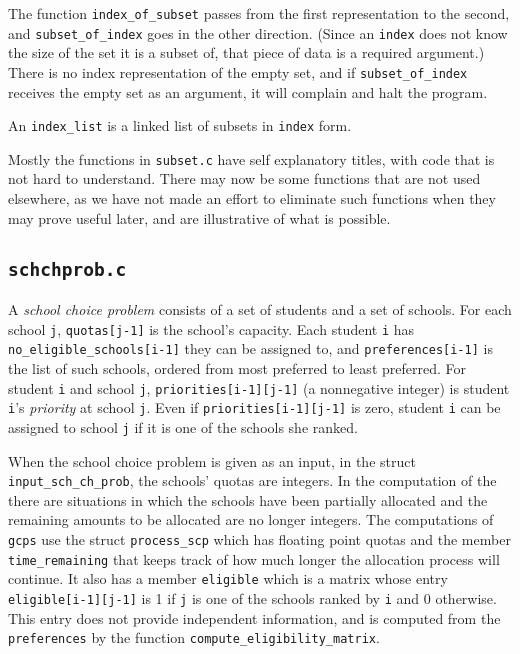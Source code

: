 \documentclass[12pt]{article}
\theoremstyle{definition}
\begin{document}
\begin{appendix}
The function \texttt{index\_of\_subset} passes from the first
representation to the second, and \texttt{subset\_of\_index} goes in
the other direction.  (Since an \texttt{index} does not know the size
of the set it is a subset of, that piece of data is a required
argument.) There is no index representation of the empty set, and if
\texttt{subset\_of\_index} receives the empty set as an argument, it
will complain and halt the program.

An \texttt{index\_list} is a linked list of subsets in \texttt{index}
form.  

Mostly the functions in \texttt{subset.c} have self explanatory
titles, with code that is not hard to understand.  There may now be
some functions that are not used elsewhere, as we have not made an
effort to eliminate such functions when they may prove useful later,
and are illustrative of what is possible.

\subsection{\texttt{schchprob.c}}

A \emph{school choice problem} consists of a set of students and a set
of schools.  For each school \texttt{j}, \texttt{quotas[j-1]} is the
school's capacity.  Each student \texttt{i} has
\texttt{no\_eligible\_schools[i-1]} they can be assigned to, and
\texttt{preferences[i-1]} is the list of such schools, ordered from
most preferred to least preferred.  For student \texttt{i} and school
\texttt{j}, \texttt{priorities[i-1][j-1]} (a nonnegative integer) is
student \texttt{i}'s \emph{priority} at school \texttt{j}. Even if
\texttt{priorities[i-1][j-1]} is zero, student \texttt{i} can be
assigned to school \texttt{j} if it is one of the schools she ranked.

When the school choice problem is given as an input, in the struct
\texttt{input\_sch\_ch\_prob}, the schools' quotas are integers.  In
the computation of the  there are situations in which the
schools have been partially allocated and the remaining amounts to be
allocated are no longer integers. The computations of \texttt{gcps}
use the struct \texttt{process\_scp} which has floating point quotas
and the member \texttt{time\_remaining} that keeps track of how much
longer the allocation process will continue.  It also has a member
\texttt{eligible} which is a matrix whose entry
\texttt{eligible[i-1][j-1]} is 1 if \texttt{j} is one of the schools
ranked by \texttt{i} and 0 otherwise.  This entry does not provide
independent information, and is computed from the \texttt{preferences}
by the function \texttt{compute\_eligibility\_matrix}.


\end{appendix}
\end{document}

